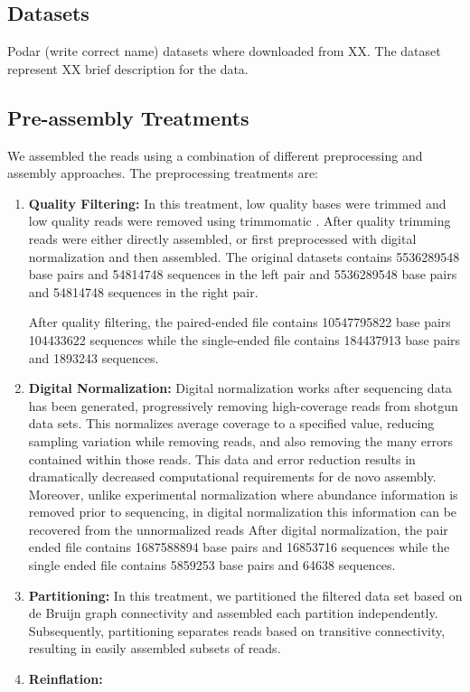 \subsection*{Datasets}


Podar (write correct name) datasets where downloaded from XX. The dataset represent XX brief description for the data. 

\subsection*{Pre-assembly Treatments  }

We assembled the reads using a combination of different preprocessing and assembly approaches.  The preprocessing treatments are:
\begin{enumerate}
 \item {\bf Quality Filtering:} In this treatment, low quality bases were trimmed and low quality reads were removed using trimmomatic \cite{trimmomatic}. After quality trimming reads were either directly assembled, or first
 preprocessed with digital normalization and then assembled.
The original datasets contains  5536289548 base pairs  and 54814748 sequences in the  left pair and 5536289548 base pairs  and 54814748 sequences in the right pair. 

After quality filtering, the paired-ended file contains 10547795822  base pairs 104433622 sequences while the single-ended file contains  184437913 base pairs and 1893243 sequences. 

 \item {\bf Digital Normalization:} Digital normalization works after sequencing data has been generated, progressively
removing high-coverage reads from shotgun data sets. This normalizes average coverage to a
specified value, reducing sampling variation while removing reads, and also removing the many errors
contained within those reads. This data and error reduction results in dramatically decreased computational
requirements for de novo assembly. Moreover, unlike experimental normalization where abundance
information is removed prior to sequencing, in digital normalization this information can be recovered
from the unnormalized reads \cite{Brown2012}
After digital normalization, the pair ended file contains 1687588894 base pairs and 16853716 sequences  while the single ended file contains 5859253 base pairs and 64638 sequences. 

 \item {\bf Partitioning:} In this treatment,  we partitioned the filtered data set based on de Bruijn graph connectivity and assembled each partition independently.  Subsequently, partitioning
separates reads based on transitive connectivity, resulting in easily assembled subsets of
reads.
 \item {\bf Reinflation:} 
\end{enumerate}


